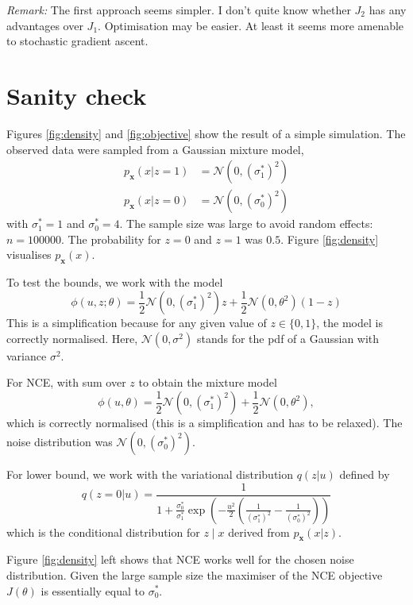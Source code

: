 \documentclass[11pt, oneside]{article}
\newcommand{\pnn}{\phi}
\newcommand{\pdata}{p_{ \mathbf x}}
\begin{document}
\emph{Remark:} The first approach seems simpler. I don't quite know whether $J_2$ has any advantages over $J_1$. Optimisation may be easier. At least it seems more amenable to stochastic gradient ascent.

\section{Sanity check}

Figures \ref{fig:density} and \ref{fig:objective} show the result of a simple simulation. The observed data were sampled from a Gaussian mixture model,
\begin{align}
  \pdata(x | z=1) &= \mathcal{N}(0,(\sigma_1^\ast)^2)\\
  \pdata(x | z=0) &= \mathcal{N}(0,(\sigma^\ast_0)^2)
  \end{align}
with  $\sigma_1^\ast = 1$ and $\sigma_0^\ast = 4$. The sample size was large to avoid random effects: $n = 100000$. The probability for $z=0$ and $z=1$ was $0.5$. Figure \ref{fig:density} visualises $\pdata(x)$.

To test the bounds, we work with the model
\begin{equation}
  \pnn(u,z; \theta) = \frac{1}{2}\mathcal{N}(0,(\sigma_1^\ast)^2)z+\frac{1}{2}\mathcal{N}(0,\theta^2)(1-z)
\end{equation}
This is a simplification because for any given value of $z \in
\{0,1\}$, the model is correctly normalised. Here,
$\mathcal{N}(0,\sigma^2)$ stands for the pdf of a Gaussian with variance $\sigma^2$.

For NCE, with sum over $z$ to obtain the mixture model
\begin{equation}
  \pnn(u,\theta) = \frac{1}{2}\mathcal{N}(0,(\sigma_1^\ast)^2)+\frac{1}{2}\mathcal{N}(0,\theta^2),
\end{equation}
which is correctly normalised (this is a simplification and has to be relaxed). The noise distribution was $\mathcal{N}(0,(\sigma^\ast_0)^2)$.

For lower bound, we work with the variational distribution $q(z| u)$ defined by
\begin{equation}
  q(z=0 | u) =\frac{1}{1+\frac{\sigma_0^\ast}{\sigma_1^\ast}\exp \left(-\frac{u^2}{2}\left(\frac{1}{(\sigma_1^\ast)^2}-\frac{1}{(\sigma_0^\ast)^2}\right)\right) }
  \label{eq:variational-example}
\end{equation}
which is the conditional distribution for $z \mid x$ derived from $\pdata(x | z)$. 

Figure \ref{fig:density} left  shows that NCE works well for the chosen noise distribution. Given the large sample size the maximiser of the NCE objective $J(\theta)$ is essentially equal to $\sigma^\ast_0$.
\end{document}
